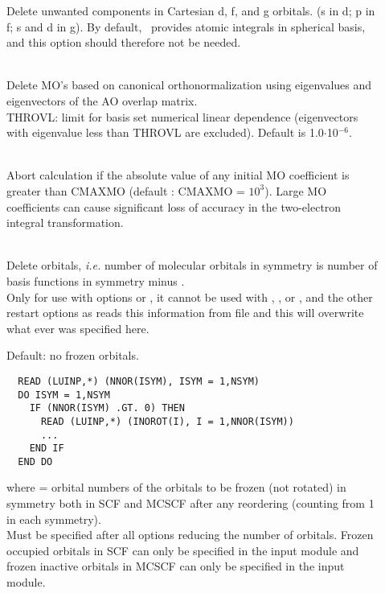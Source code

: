 \begin{description}
\item[]
  Delete unwanted components in Cartesian d, f, and g orbitals.
  (s in d; p in f; s and d in g). By default, \her\ provides atomic
  integrals in spherical basis, and this option should therefore not
  be needed.

\item[]
   \\
  Delete MO's based on canonical orthonormalization using eigenvalues
  and eigenvectors of the AO overlap matrix. \\
  THROVL: limit for basis
  set numerical linear dependence (eigenvectors with eigenvalue less
  than THROVL are excluded). Default is 1.0$\cdot$10$^{-6}$.

\item[]
   \\
  Abort calculation if the absolute value of any initial MO coefficient is
  greater than CMAXMO (default : CMAXMO = $10^3$).  Large MO coefficients
  can cause significant loss of accuracy in the two-electron integral
  transformation.

\item[]
   \\
  Delete orbitals, {\it i.e.\/} number of molecular orbitals
  in symmetry  is number of basis functions in symmetry  minus
  . \\
  Only for use with  options  or , 
  it cannot be used with , , or ,
  and the other restart options as  reads this information from file
  and this will overwrite what ever was specified here.

\item[]
  Default: no frozen orbitals.
\begin{verbatim}
  READ (LUINP,*) (NNOR(ISYM), ISYM = 1,NSYM)
  DO ISYM = 1,NSYM
    IF (NNOR(ISYM) .GT. 0) THEN
      READ (LUINP,*) (INOROT(I), I = 1,NNOR(ISYM))
      ...
    END IF
  END DO
\end{verbatim}
  where  = orbital numbers of the orbitals to be
          frozen (not rotated)
          in symmetry  both in SCF and MCSCF
          after any reordering (counting from 1 in each symmetry).\\
  Must be specified after all options reducing the number of orbitals.
  Frozen occupied orbitals in SCF can only be specified in the  input module
  and frozen inactive orbitals in MCSCF can only be specified in the 
  input module.


\end{description}
